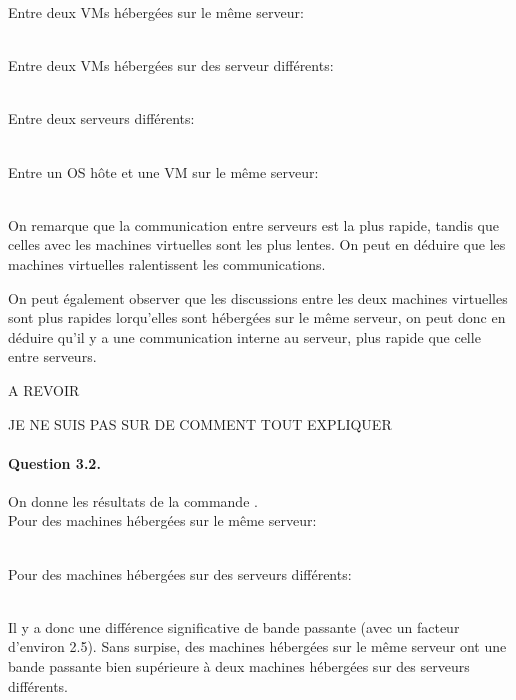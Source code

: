 \documentclass[12pt]{article}
\begin{document}
Entre deux VMs hébergées sur le même serveur:

\\

Entre deux VMs hébergées sur des serveur différents:

\\

Entre deux serveurs différents:

\\

Entre un OS hôte et une VM sur le même serveur:

\\

On remarque que la communication entre serveurs est la plus rapide, tandis que celles avec les machines virtuelles sont les plus lentes. On peut en déduire que les machines virtuelles ralentissent les communications.

On peut également observer que les discussions entre les deux machines virtuelles sont plus rapides lorqu'elles sont hébergées sur le même serveur, on peut donc en déduire qu'il y a une communication interne au serveur, plus rapide que celle entre serveurs.



A REVOIR

JE NE SUIS PAS SUR DE COMMENT TOUT EXPLIQUER

\paragraph{Question 3.2.}
On donne les résultats de la commande .
\\

Pour des machines hébergées sur le même serveur:

\\

Pour des machines hébergées sur des serveurs différents:

\\

Il y a donc une différence significative de bande passante (avec un facteur d'environ 2.5). Sans surpise, des machines hébergées sur le même serveur ont une bande passante bien supérieure à deux machines hébergées sur des serveurs différents.
\end{document}
